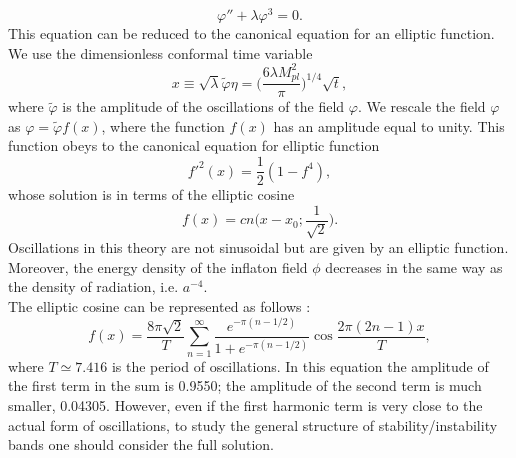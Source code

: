 \documentclass[11pt,a4paper,twoside]{book}
\begin{document}
 \begin{equation}
 	\label{Chap4:labdaPhi4_eomPhi3}
 	\varphi'' + \lambda\varphi^{3}=0.
 \end{equation}
 This equation can be reduced to the canonical equation for an elliptic function. We use the dimensionless conformal time variable
 \begin{equation}
\label{Chap4:lambdaPhi4_conformalTimeVariable}
x\equiv \sqrt{\lambda} \tilde{\varphi}\eta = \Bigg( \frac{6\lambda M_{pl}^{2}}{\pi}\Bigg)^{1/4}\sqrt{t},
 \end{equation}
 where $\tilde{\varphi}$ is the amplitude of the oscillations of the field $\varphi$. We rescale the field $\varphi$ as $\varphi=\tilde{\varphi}f(x)$, where the function $ f(x) $ has an amplitude equal to unity. This function  obeys to the canonical equation for elliptic function
 \begin{equation}
 	\label{chap4:lambdaPhi4_EllipticFunction}
 	f'^{2}(x)=\frac{1}{2}(1-f^{4}),
 \end{equation}
 whose solution is in terms of the elliptic cosine
 \begin{equation}
\label{Chap4:lambdaPhi4_solutionF(x)}
	f(x)=cn\Bigg(x-x_{0};\frac{1}{\sqrt{2}}\Bigg).
 \end{equation}
 Oscillations in this theory are not sinusoidal but are given by an elliptic function. Moreover, the energy density of the inflaton field $\phi$ decreases in the same way as the density of radiation, i.e. $ a^{-4} $.\\
 The elliptic cosine can be represented as follows \cite{Chap4:ModelLambdaPhi4Reference}:
 \begin{equation}
\label{Chap4:lambdaPhi4_EllipticCosineForm}
f(x)=\frac{8\pi\sqrt{2}}{T}\sum_{n=1}^{\infty}\frac{e^{-\pi(n-1/2)}}{1+e^{-\pi (n-1/2)}}\cos \frac{2\pi (2n-1)x}{T},
 \end{equation}
 where $ T \simeq 7.416 $ is the period of oscillations. In this equation the amplitude of the first term in the sum is 0.9550; the amplitude of the second term is much smaller, 0.04305. However, even if the first harmonic term is very close to the actual form of oscillations, to study the general structure of stability/instability bands one should consider the full solution.\\
\end{document}
